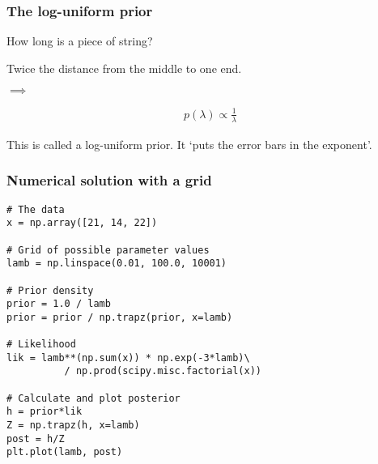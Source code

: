 \documentclass{beamer}
\begin{document}
\begin{frame}
\frametitle{The log-uniform prior}
How long is a piece of string?

\pause
Twice the distance from the middle to one end.

$\implies$

\begin{align}
p(\lambda) \propto \frac{1}{\lambda}
\end{align}

This is called a log-uniform prior. It `puts the error bars in the exponent'.

\end{frame}


\begin{frame}[t, fragile]
\frametitle{Numerical solution with a grid}

\begin{verbatim}
# The data
x = np.array([21, 14, 22])

# Grid of possible parameter values
lamb = np.linspace(0.01, 100.0, 10001)

# Prior density
prior = 1.0 / lamb
prior = prior / np.trapz(prior, x=lamb)

# Likelihood
lik = lamb**(np.sum(x)) * np.exp(-3*lamb)\
          / np.prod(scipy.misc.factorial(x))

# Calculate and plot posterior
h = prior*lik
Z = np.trapz(h, x=lamb)
post = h/Z
plt.plot(lamb, post)
\end{verbatim}

\end{frame}
\end{document}

